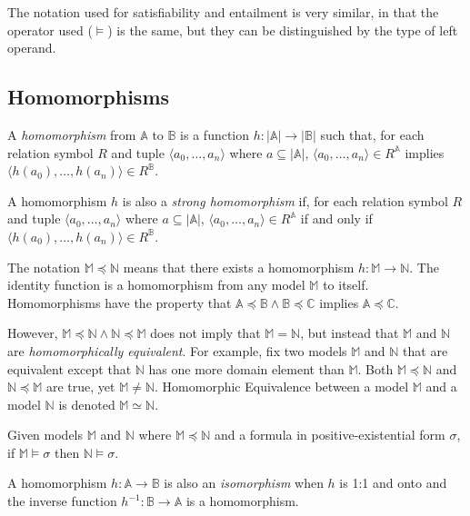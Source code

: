 		The notation used for satisfiability and entailment is very similar, in
		that the operator used ($\models$) is the same, but they can be
		distinguished by the type of left operand.

	\subsection{Homomorphisms}

		A \emph{homomorphism} from $\mathbb{A}$ to $\mathbb{B}$ is a function
		$h: |\mathbb{A}|\to|\mathbb{B}|$ such that, for each relation symbol
		$R$ and tuple $\langle a_0 , \ldots , a_n \rangle$ where $a \subseteq
		|\mathbb{A}|$, $\langle a_0 , \ldots , a_n  \rangle \in R^\mathbb{A}$
		implies $\langle h(a_0) , \ldots , h(a_n) \rangle \in R^\mathbb{B}$.

		A homomorphism $h$ is also a \emph{strong homomorphism} if, for each
		relation symbol $R$ and tuple $\langle a_0 , \ldots , a_n \rangle$
		where $a \subseteq |\mathbb{A}|$, $\langle a_0 , \ldots , a_n  \rangle
		\in R^\mathbb{A}$ if and only if $\langle h(a_0) , \ldots , h(a_n)
		\rangle \in R^\mathbb{B}$.

		The notation $\mathbb{M} \preceq \mathbb{N}$ means that there exists a
		homomorphism $h : \mathbb{M} \to \mathbb{N}$. The identity function is
		a homomorphism from any model $\mathbb{M}$ to itself.  Homomorphisms
		have the property that $\mathbb{A} \preceq \mathbb{B} \wedge \mathbb{B}
		\preceq \mathbb{C}$ implies $\mathbb{A} \preceq \mathbb{C}$.

		However, $\mathbb{M} \preceq \mathbb{N} \wedge \mathbb{N} \preceq
		\mathbb{M}$ does not imply that $\mathbb{M} = \mathbb{N}$, but instead
		that $\mathbb{M}$ and $\mathbb{N}$ are \emph{homomorphically
		equivalent}.  For example, fix two models $\mathbb{M}$ and $\mathbb{N}$
		that are equivalent except that $\mathbb{N}$ has one more domain
		element than $\mathbb{M}$. Both $\mathbb{M} \preceq \mathbb{N}$ and
		$\mathbb{N} \preceq \mathbb{M}$ are true, yet $\mathbb{M} \neq
		\mathbb{N}$. Homomorphic Equivalence between a model $\mathbb{M}$ and a
		model $\mathbb{N}$ is denoted $\mathbb{M} \simeq \mathbb{N}$.

		Given models $\mathbb{M}$ and $\mathbb{N}$ where $\mathbb{M} \preceq
		\mathbb{N}$ and a formula in positive-existential form $\sigma$, if
		$\mathbb{M} \models \sigma$ then $\mathbb{N} \models \sigma$.

		A homomorphism $h : \mathbb{A} \to \mathbb{B}$ is also an
		\emph{isomorphism} when $h$ is 1:1 and onto and the inverse function
		$h^{-1} : \mathbb{B} \to \mathbb{A}$ is a homomorphism.

